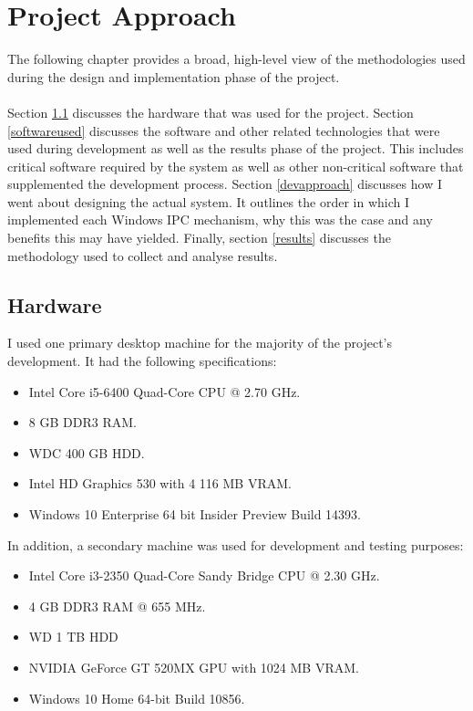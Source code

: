 \documentclass[12pt] {newrucsthesis}    %
\begin{document}
  \chapter{Project Approach}
    The following chapter provides a broad, high-level view of the methodologies used during the
    design and implementation phase of the project.
    \\\\
    Section \ref{hardwareused} discusses the hardware that was used for the project.
    Section \ref{softwareused} discusses the software and other related technologies that were used
    during development as well as the results phase of the project. This includes critical software
    required by the system as well as other non-critical software that supplemented the development process.
    Section \ref{devapproach} discusses how I went about designing the actual system. It outlines the
    order in which I implemented each Windows IPC mechanism, why this was the case and any benefits this
    may have yielded. Finally, section \ref{results} discusses the methodology used to collect and analyse results.

    \section{Hardware} \label{hardwareused} %
      I used one primary desktop machine for the majority of the project's development. It had the following specifications:
        \begin{itemize}
          \item Intel Core i5-6400 Quad-Core CPU @ 2.70 GHz.
          \item 8 GB DDR3 RAM.
          \item WDC 400 GB HDD.
          \item Intel HD Graphics 530 with 4 116 MB VRAM.
          \item Windows 10 Enterprise 64 bit Insider Preview Build 14393.
        \end{itemize}
      In addition, a secondary machine was used for development and testing purposes:
        \begin{itemize}
          \item	Intel Core i3-2350 Quad-Core Sandy Bridge CPU @ 2.30 GHz.
        	\item	4 GB DDR3 RAM @ 655 MHz.
          \item WD 1 TB HDD
        	\item NVIDIA GeForce GT 520MX GPU with 1024 MB VRAM.
          \item Windows 10 Home 64-bit Build 10856.
        \end{itemize}
\end{document}
